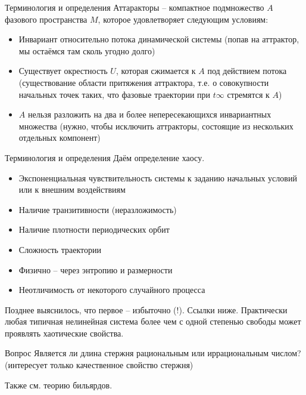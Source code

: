 \documentclass{beamer}
\begin{document}
\begin{frame}{Терминология и определения}
Аттаракторы -- компактное подмножество $A$ фазового пространства $M$, которое удовлетворяет следующим условиям:
                \begin{itemize}
                        \item Инвариант относительно потока динамической системы (попав на аттрактор, мы остаёмся там сколь угодно долго)
                        \item Существует окрестность $U$, которая сжимается к $A$ под действием потока (существование области притяжения аттрактора, т.е. о совокупности начальных точек таких, что фазовые траектории при $t \infty$ стремятся к $A$)
                        \item $A$ нельзя разложить на два и более непересекающихся инвариантных множества (нужно, чтобы исключить аттракторы, состоящие из нескольких отдельных компонент)
                \end{itemize}
\end{frame}


\begin{frame}{Терминология и определения}
Даём определение хаосу.
                \begin{itemize}
                        \item Экспоненциальная чувствительность системы к заданию начальных условий или к внешним воздействиям
                        \item Наличие транзитивности (неразложимость)
                        \item Наличие плотности периодических орбит
                        \item Сложность траектории
                        \item Физично -- через энтропию и размерности
                        \item Неотличимость от некоторого случайного процесса
                \end{itemize}
                Позднее выяснилось, что первое -- избыточно (!). Ссылки ниже.
                Практически любая типичная нелинейная система более чем с одной степенью свободы может проявлять хаотические свойства.
\end{frame}


\begin{frame}{Вопрос}
        Является ли длина стержня рациональным или иррациональным числом? (интересует только качественное свойство стержня)

        Также см. теорию бильярдов. 
\end{frame}
\end{document}

